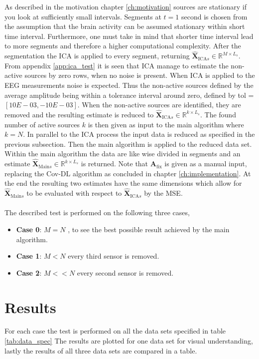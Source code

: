 As described in the motivation chapter \ref{ch:motivation} sources are stationary if you look at sufficiently small intervals. 
Segments at $t = 1$ second is chosen from the assumption that the brain activity can be assumed stationary within short time interval.
Furthermore, one must take in mind that shorter time interval lead to more segments and therefore a higher computational complexity. 
After the segmentation the ICA is applied to every segment, returning $\hat{\textbf{X}}_{\text{ICA} s} \in \mathbb{R}^{M \times L_s}$.
From appendix \ref{app:ica_test} it is seen that ICA manage to estimate the non-active sources by zero rows, when no noise is present. 
When ICA is applied to the EEG measurements noise is expected. 
Thus the non-active sources defined by the average amplitude being within a tolerance interval around zero, defined by tol = $[10E-03, -10E-03]$. 
When the non-active sources are identified, they are removed and the resulting estimate is reduced to $\hat{\textbf{X}}_{\text{ICA} s} \in \mathbb{R}^{k \times L_s}$. 
The found number of active sources $k$ is then given as input to the main algorithm where $k = N$. 
In parallel to the ICA process the input data is reduced as specified in the previous subsection. 
Then the main algorithm is applied to the reduced data set. 
Within the main algorithm the data are like wise divided in segments and an estimate $\hat{\textbf{X}}_{\text{Main} s} \in \mathbb{R}^{k \times L_s}$ is returned. 
Note that $\textbf{A}_{\text{fix}}$ is given as a manual input, replacing the Cov-DL algorithm as concluded in chapter \ref{ch:implementation}.
At the end the resulting two estimates have the same dimensions which allow for $\hat{\textbf{X}}_{\text{Main} s}$ to be evaluated with respect to $\hat{\textbf{X}}_{\text{ICA} s}$ by the MSE. 
\\ \\
The described test is performed on the following three cases,
\begin{itemize}
\item \textbf{Case 0}: $M = N$ , to see the best possible result achieved by the main algorithm. 
\item \textbf{Case 1}: $M < N$ every third sensor is removed. 
\item \textbf{Case 2}: $M << N$ every second sensor is removed.
\end{itemize}

\section{Results}
For each case the test is performed on all the data sets specified in table \ref{tab:data_spec}
The results are plotted for one data set for visual understanding, lastly the results of all three data sets are compared in a table.  


